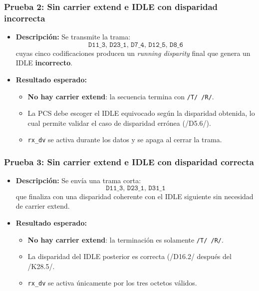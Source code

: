 \subsubsection*{Prueba 2: Sin carrier extend e IDLE con disparidad incorrecta}

\begin{itemize}
  \item \textbf{Descripción:}  
    Se transmite la trama:
    \[
      \texttt{D11\_3,\ D23\_1,\ D7\_4,\ D12\_5,\ D8\_6}
    \]
    cuyas cinco codificaciones producen un \emph{running disparity} final que genera un IDLE \textbf{incorrecto}.
  \item \textbf{Resultado esperado:}
    \begin{itemize}
      \item \textbf{No hay carrier extend}: la secuencia termina con \texttt{/T/ /R/}.
      \item La PCS debe escoger el IDLE equivocado según la disparidad obtenida, lo cual permite validar el caso de disparidad errónea (/D5.6/).
      \item \texttt{rx\_dv} se activa durante los datos y se apaga al cerrar la trama.
    \end{itemize}
\end{itemize}


\subsubsection*{Prueba 3: Sin carrier extend e IDLE con disparidad correcta}

\begin{itemize}
  \item \textbf{Descripción:}
    Se envía una trama corta:
    \[
      \texttt{D11\_3,\ D23\_1,\ D31\_1}
    \]
    que finaliza con una disparidad coherente con el IDLE siguiente sin necesidad de carrier extend.
  \item \textbf{Resultado esperado:}
    \begin{itemize}
      \item \textbf{No hay carrier extend}: la terminación es solamente \texttt{/T/ /R/}.
      \item La disparidad del IDLE posterior es correcta (/D16.2/ después del /K28.5/.
      \item \texttt{rx\_dv} se activa únicamente por los tres octetos válidos.
    \end{itemize}
\end{itemize}


